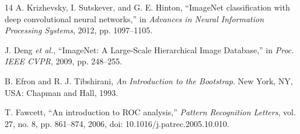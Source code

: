 \documentclass[journal]{IEEEtran}
\begin{document}
\begin{thebibliography}{14}
A. Krizhevsky, I. Sutskever, and G. E. Hinton, ``ImageNet classification with deep convolutional neural networks,'' in \emph{Advances in Neural Information Processing Systems}, 2012, pp. 1097--1105.

J. Deng \emph{et al.}, ``ImageNet: A Large-Scale Hierarchical Image Database,'' in \emph{Proc. IEEE CVPR}, 2009, pp. 248--255.

B. Efron and R. J. Tibshirani, \emph{An Introduction to the Bootstrap}. New York, NY, USA: Chapman and Hall, 1993.

T. Fawcett, ``An introduction to ROC analysis,'' \emph{Pattern Recognition Letters}, vol. 27, no. 8, pp. 861--874, 2006, doi: 10.1016/j.patrec.2005.10.010.

\end{thebibliography}
\end{document}
